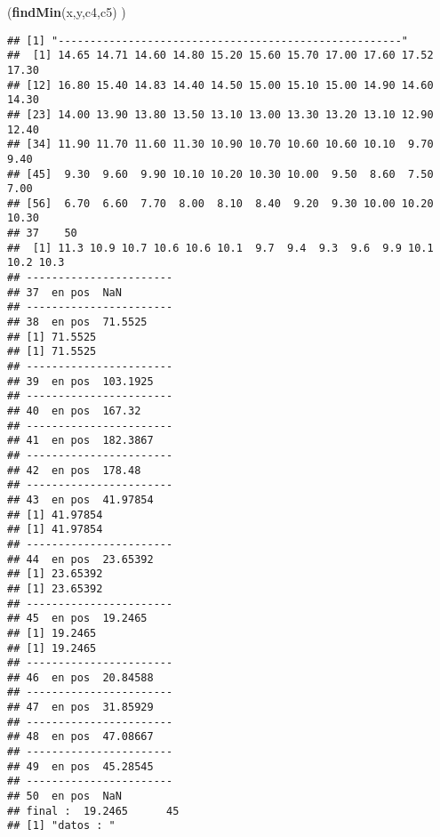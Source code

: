 \documentclass[]{article}
\newenvironment{Shaded}{\begin{snugshade}}{\end{snugshade}}
\newcommand{\KeywordTok}[1]{\textcolor[rgb]{0.13,0.29,0.53}{\textbf{#1}}}
\newcommand{\NormalTok}[1]{#1}
\begin{document}
\begin{Shaded}
\begin{Highlighting}[]
\NormalTok{(}\KeywordTok{findMin}\NormalTok{(x,y,c4,c5) )}
\end{Highlighting}
\end{Shaded}

\begin{verbatim}
## [1] "------------------------------------------------------"
##  [1] 14.65 14.71 14.60 14.80 15.20 15.60 15.70 17.00 17.60 17.52 17.30
## [12] 16.80 15.40 14.83 14.40 14.50 15.00 15.10 15.00 14.90 14.60 14.30
## [23] 14.00 13.90 13.80 13.50 13.10 13.00 13.30 13.20 13.10 12.90 12.40
## [34] 11.90 11.70 11.60 11.30 10.90 10.70 10.60 10.60 10.10  9.70  9.40
## [45]  9.30  9.60  9.90 10.10 10.20 10.30 10.00  9.50  8.60  7.50  7.00
## [56]  6.70  6.60  7.70  8.00  8.10  8.40  9.20  9.30 10.00 10.20 10.30
## 37    50 
##  [1] 11.3 10.9 10.7 10.6 10.6 10.1  9.7  9.4  9.3  9.6  9.9 10.1 10.2 10.3
## -----------------------
## 37  en pos  NaN 
## -----------------------
## 38  en pos  71.5525 
## [1] 71.5525
## [1] 71.5525
## -----------------------
## 39  en pos  103.1925 
## -----------------------
## 40  en pos  167.32 
## -----------------------
## 41  en pos  182.3867 
## -----------------------
## 42  en pos  178.48 
## -----------------------
## 43  en pos  41.97854 
## [1] 41.97854
## [1] 41.97854
## -----------------------
## 44  en pos  23.65392 
## [1] 23.65392
## [1] 23.65392
## -----------------------
## 45  en pos  19.2465 
## [1] 19.2465
## [1] 19.2465
## -----------------------
## 46  en pos  20.84588 
## -----------------------
## 47  en pos  31.85929 
## -----------------------
## 48  en pos  47.08667 
## -----------------------
## 49  en pos  45.28545 
## -----------------------
## 50  en pos  NaN 
## final :  19.2465      45 
## [1] "datos : "
\end{verbatim}
\end{document}

